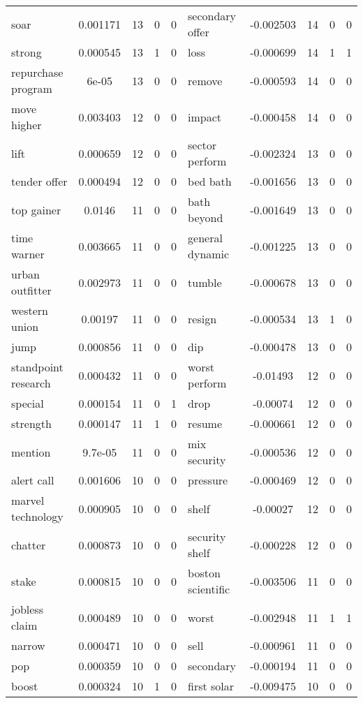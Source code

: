 \documentclass[ oneside,%
                    author={Joshua Felmeden},
                    degree={MEng},
                     title={Sentiment Analysis of Financial Headlines Based on Stock Returns},
                  subtitle={Research}]{dissertation}
\begin{document}
\begin{table}[!ht]
\begin{tabular}{lcccclcccc}
soar & 0.001171 & 13 & 0 & 0 & secondary offer & -0.002503 & 14 & 0 & 0 \\
strong & 0.000545 & 13 & 1 & 0 & loss & -0.000699 & 14 & 1 & 1 \\
repurchase program & 6e-05 & 13 & 0 & 0 & remove & -0.000593 & 14 & 0 & 0 \\
move higher & 0.003403 & 12 & 0 & 0 & impact & -0.000458 & 14 & 0 & 0 \\
lift & 0.000659 & 12 & 0 & 0 & sector perform & -0.002324 & 13 & 0 & 0 \\
tender offer & 0.000494 & 12 & 0 & 0 & bed bath & -0.001656 & 13 & 0 & 0 \\
top gainer & 0.0146 & 11 & 0 & 0 & bath beyond & -0.001649 & 13 & 0 & 0 \\
time warner & 0.003665 & 11 & 0 & 0 & general dynamic & -0.001225 & 13 & 0 & 0 \\
urban outfitter & 0.002973 & 11 & 0 & 0 & tumble & -0.000678 & 13 & 0 & 0 \\
western union & 0.00197 & 11 & 0 & 0 & resign & -0.000534 & 13 & 1 & 0 \\
jump & 0.000856 & 11 & 0 & 0 & dip & -0.000478 & 13 & 0 & 0 \\
standpoint research & 0.000432 & 11 & 0 & 0 & worst perform & -0.01493 & 12 & 0 & 0 \\
special & 0.000154 & 11 & 0 & 1 & drop & -0.00074 & 12 & 0 & 0 \\
strength & 0.000147 & 11 & 1 & 0 & resume & -0.000661 & 12 & 0 & 0 \\
mention & 9.7e-05 & 11 & 0 & 0 & mix security & -0.000536 & 12 & 0 & 0 \\
alert call & 0.001606 & 10 & 0 & 0 & pressure & -0.000469 & 12 & 0 & 0 \\
marvel technology & 0.000905 & 10 & 0 & 0 & shelf & -0.00027 & 12 & 0 & 0 \\
chatter & 0.000873 & 10 & 0 & 0 & security shelf & -0.000228 & 12 & 0 & 0 \\
stake & 0.000815 & 10 & 0 & 0 & boston scientific & -0.003506 & 11 & 0 & 0 \\
jobless claim & 0.000489 & 10 & 0 & 0 & worst & -0.002948 & 11 & 1 & 1 \\
narrow & 0.000471 & 10 & 0 & 0 & sell & -0.000961 & 11 & 0 & 0 \\
pop & 0.000359 & 10 & 0 & 0 & secondary & -0.000194 & 11 & 0 & 0 \\
boost & 0.000324 & 10 & 1 & 0 & first solar & -0.009475 & 10 & 0 & 0 \\

\end{tabular}
\end{table}
\end{document}
